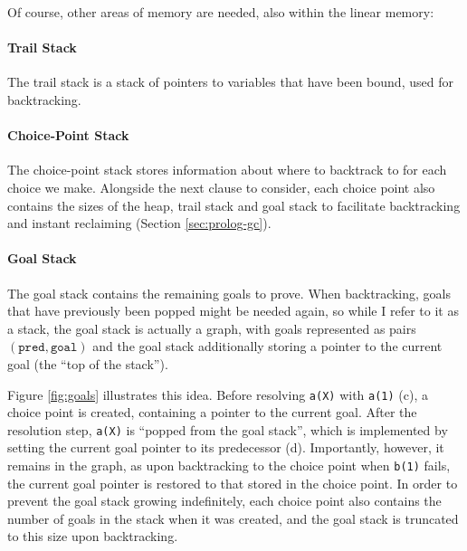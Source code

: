 Of course, other areas of memory are needed, also within the linear memory:

\paragraph{Trail Stack} The trail stack is a stack of pointers to variables that have been bound, used for backtracking.

\paragraph{Choice-Point Stack} The choice-point stack stores information about where to backtrack to for each choice we make. Alongside the next clause to consider, each choice point also contains the sizes of the heap, trail stack and goal stack to facilitate backtracking and instant reclaiming (Section \ref{sec:prolog-gc}).

\paragraph{Goal Stack} The goal stack contains the remaining goals to prove. When backtracking, goals that have previously been popped might be needed again, so while I refer to it as a stack, the goal stack is actually a graph, with goals represented as pairs $(\texttt{pred}, \texttt{goal})$ and the goal stack additionally storing a pointer to the current goal (the ``top of the stack'').

Figure \ref{fig:goals} illustrates this idea. Before resolving \texttt{a(X)} with \texttt{a(1)} (c), a choice point is created, containing a pointer to the current goal. After the resolution step, \texttt{a(X)} is ``popped from the goal stack'', which is implemented by setting the current goal pointer to its predecessor (d). Importantly, however, it remains in the graph, as upon backtracking to the choice point when \texttt{b(1)} fails, the current goal pointer is restored to that stored in the choice point. In order to prevent the goal stack growing indefinitely, each choice point also contains the number of goals in the stack when it was created, and the goal stack is truncated to this size upon backtracking.

